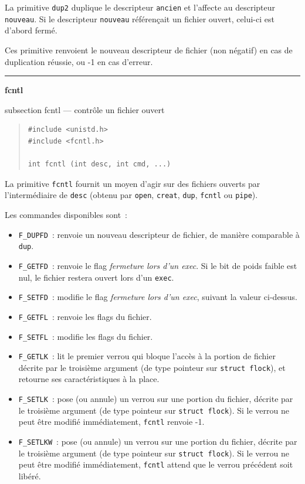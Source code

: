 \documentclass [twoside] {report}
\newcommand {\primitive} [1]
    {
	\phantomsection
	{\large \textbf {#1}}
	\addcontentsline {toc} {subsection} {#1}
    }
\newcommand {\separation}
    {
	\vspace {5mm}
	\nopagebreak
	\hrule
    }
\begin{document}
La primitive \texttt {dup2} duplique le descripteur \texttt {ancien} et
l'affecte au descripteur \texttt {nouveau}. Si le descripteur \texttt {nouveau}
référençait un fichier ouvert, celui-ci est d'abord fermé.

Ces primitive renvoient le nouveau descripteur de fichier
(non négatif) en cas de duplication
réussie, ou -1 en cas d'erreur.




\separation
\primitive {fcntl} --- contrôle un fichier ouvert

\begin {quote}
\begin {verbatim}
#include <unistd.h>
#include <fcntl.h>

int fcntl (int desc, int cmd, ...)
\end{verbatim}
\end {quote}

La primitive \texttt {fcntl} fournit un moyen
d'agir sur des fichiers ouverts par
l'intermédiaire de
\texttt {desc} (obtenu par \texttt {open}, \texttt {creat}, \texttt {dup},
\texttt {fcntl} ou \texttt {pipe}).

Les commandes disponibles sont~:

\begin {itemize}
    \item \texttt {F\_DUPFD}~: renvoie un nouveau descripteur de
	fichier, de manière comparable à \texttt {dup}.

    \item \texttt {F\_GETFD}~: renvoie le flag \textit {fermeture lors
	d'un exec}. Si le bit de poids faible est nul, le
	fichier restera ouvert lors d'un \texttt {exec}.

    \item \texttt {F\_SETFD}~: modifie le flag \textit {fermeture lors
	d'un exec}, suivant la valeur ci-dessus.

    \item \texttt {F\_GETFL}~: renvoie les flags du fichier.

    \item \texttt {F\_SETFL}~: modifie les flags du fichier.

    \item \texttt {F\_GETLK}~:  lit le premier verrou qui bloque l'accès à
	la portion de fichier décrite par le troisième argument (de type
	pointeur sur \texttt {struct flock}), et retourne ses
	caractéristiques à la place.

    \item \texttt {F\_SETLK}~:  pose (ou annule) un verrou sur une portion
	du fichier, décrite par le troisième argument (de type pointeur
	sur \texttt {struct flock}).  Si le verrou ne peut être modifié
	immédiatement, \texttt {fcntl} renvoie -1.

    \item \texttt {F\_SETLKW}~:  pose (ou annule) un verrou sur une portion
	du fichier, décrite par le troisième argument (de type pointeur
	sur \texttt {struct flock}).  Si le verrou ne peut être modifié
	immédiatement, \texttt {fcntl} attend que le verrou précédent soit
	libéré.

\end {itemize}
\end{document}
